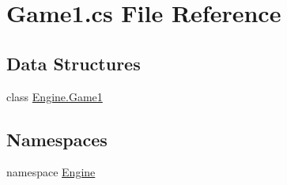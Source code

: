 \hypertarget{a00008}{}\section{Game1.\+cs File Reference}
\label{a00008}
\subsection*{Data Structures}
\begin{DoxyCompactItemize}
\item 
class \hyperlink{a00306}{Engine.\+Game1}
\end{DoxyCompactItemize}
\subsection*{Namespaces}
\begin{DoxyCompactItemize}
\item 
namespace \hyperlink{a00240}{Engine}
\end{DoxyCompactItemize}
